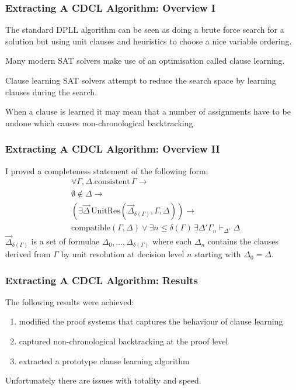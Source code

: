 \documentclass{beamer}
\newcommand{\compatible}[2]{\mathrm{compatible}(#1,#2)}
\newcommand{\consistent}{\mathrm{consistent\,}}
\newcommand{\DeltaVec}{\overrightarrow{\Delta}}
\begin{document}
\begin{frame}
\frametitle{Extracting A CDCL Algorithm: Overview I}
The standard DPLL algorithm can be seen as doing a brute force search for a solution but using unit clauses and heuristics to choose a nice variable ordering.

\medskip

Many modern SAT solvers make use of an optimisation called \alert{clause learning}.

\medskip

Clause learning SAT solvers attempt to reduce the search space by learning clauses during the search.
\medskip

When a clause is learned it may mean that a number of assignments have to be undone which causes \alert{non-chronological backtracking}.


\end{frame}

\begin{frame}
\frametitle{Extracting A CDCL Algorithm: Overview II}

I proved a completeness statement of the following form:
\begin{align*}
 &\forall \Gamma, \Delta. \consistent{\Gamma} \to   \\ 
 &\emptyset \notin \Delta \to \\ 
&( \exists \DeltaVec \, \mathrm{UnitRes}(\DeltaVec_{\delta(\Gamma)} , \Gamma,  \Delta) )\to \\
&\compatible{\Gamma}{\Delta} \vee \exists n \leq \delta(\Gamma) \,    \exists \Delta'  \Gamma_n  \vdash_{\Delta'} \Delta
\end{align*}
$\DeltaVec_{\delta(\Gamma)}$ is a set of formulae $\Delta_0, \ldots, \Delta_{\delta(\Gamma)}$ where each $\Delta_n$ contains the clauses derived from $\Gamma$ by unit resolution at  decision level $n$ starting with $\Delta_0 = \Delta$.
\end{frame}

\begin{frame}
\frametitle{Extracting A CDCL Algorithm: Results}

The following results were achieved:
\begin{enumerate}
\item modified the proof systems that captures the behaviour of clause learning
\item captured non-chronological backtracking at the proof level
\item extracted a prototype clause learning algorithm
\end{enumerate}
\bigskip

Unfortunately there are issues with totality and speed. 
\end{frame}
\end{document}

